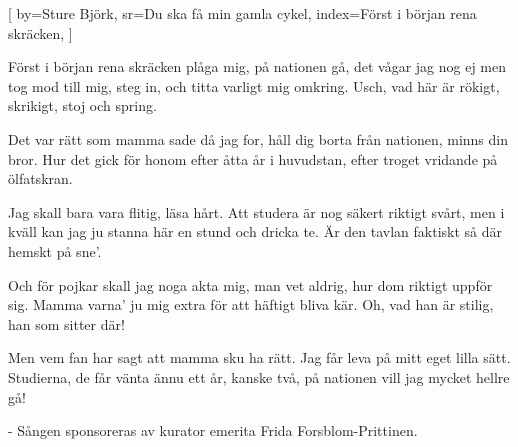 
[
	by={Sture Björk},
	sr={Du ska få min gamla cykel},
	index={Först i början rena skräcken},
	]

\beginverse*
Först i början rena skräcken plåga mig,
på nationen gå, det vågar jag nog ej
men tog mod till mig, steg in,
och titta varligt mig omkring.
Usch, vad här är rökigt, skrikigt, stoj och spring.
\endverse

\beginverse*
Det var rätt som mamma sade då jag for,
håll dig borta från nationen, minns din bror.
Hur det gick för honom
efter åtta år i huvudstan,
efter troget vridande på ölfatskran.
\endverse

\beginverse*
Jag skall bara vara flitig, läsa hårt.
Att studera är nog säkert riktigt svårt,
men i kväll kan jag ju stanna här en stund
och dricka te.
Är den tavlan faktiskt så där hemskt på sne'.
\endverse

\beginverse*
Och för pojkar skall jag noga akta mig,
man vet aldrig, hur dom riktigt uppför sig.
Mamma varna' ju mig extra
för att häftigt bliva kär.
Oh, vad han är stilig, han som sitter där!
\endverse

\beginverse*
Men vem fan har sagt att mamma sku ha rätt.
Jag får leva på mitt eget lilla sätt.
Studierna, de får vänta ännu ett år, kanske två,
på nationen vill jag mycket hellre gå!
\endverse

\beginverse*
- Sången sponsoreras av kurator emerita Frida Forsblom-Prittinen.
\endverse
\endsong